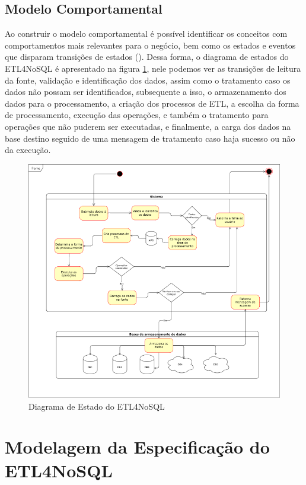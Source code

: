 \subsection{Modelo Comportamental}

Ao construir o modelo comportamental é possível identificar os conceitos com comportamentos mais relevantes para o negócio, bem como os estados e eventos que disparam transições de estados (\cite{itana:2005}). Dessa forma, o diagrama de estados do ETL4NoSQL é apresentado na figura \ref{diagrama_estado}, nele podemos ver as transições de leitura da fonte, validação e identificação dos dados, assim como o tratamento caso os dados não possam ser identificados, subsequente a isso, o armazenamento dos dados para o processamento, a criação dos processos de ETL, a escolha da forma de processamento, execução das operações, e também o tratamento para operações que não puderem ser executadas, e finalmente, a carga dos dados na base destino seguido de uma mensagem de tratamento caso haja sucesso ou não da execução.

\begin{figure}[h!]
	\centering
	\includegraphics[scale=0.6]{fig/diagrama_estado.png}
	\caption{Diagrama de Estado do ETL4NoSQL}
	\label{diagrama_estado}
\end{figure}

\section{Modelagem da Especificação do ETL4NoSQL}

